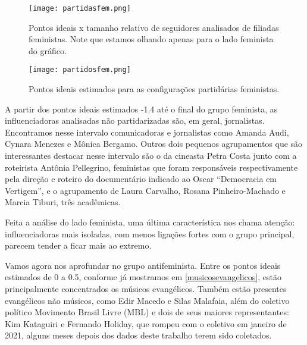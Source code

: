 \documentclass[
	12pt,				%
	openright,			%
	twoside,			%
	a4paper,			%
	english,			%
	brazil				%
	]{abntex2}
\begin{document}
 \begin{figure}[!htbp]
    \centering
    \texttt{[image: partidasfem.png]}
    \caption{Pontos ideais x tamanho relativo de seguidores analisados de filiadas feministas. Note que estamos olhando apenas para o lado feminista do gráfico.}
    \label{partidasfem}
 \end{figure}

 \begin{figure}[!htbp]
    \centering
    \texttt{[image: partidosfem.png]}
    \caption{Pontos ideais estimados para as configurações partidárias feministas.}
    \label{partidosfem}
 \end{figure}
 
 \newpage
  
 A partir dos pontos ideais estimados -1.4 até o final do grupo feminista, as influenciadoras analisadas não partidarizadas são, em geral, jornalistas. Encontramos nesse intervalo comunicadoras e jornalistas como Amanda Audi, Cynara Menezes e Mônica Bergamo. Outros dois pequenos agrupamentos que são interessantes destacar nesse intervalo são o da cineasta Petra Costa junto com a roteirista Antônia Pellegrino, feministas que foram responsáveis respectivamente pela direção e roteiro do documentário indicado ao Oscar ``Democracia em Vertigem'', e o agrupamento de Laura Carvalho, Rosana Pinheiro-Machado e Marcia Tiburi, três acadêmicas.
 
 Feita a análise do lado feminista, uma última característica nos chama atenção: influenciadoras mais isoladas, com menos ligações fortes com o grupo principal, parecem tender a ficar mais ao extremo.
 
 Vamos agora nos aprofundar no grupo antifeminista. Entre os pontos ideais estimados de 0 a 0.5, conforme já mostramos em \ref{musicosevangelicos}, estão principalmente concentrados os músicos evangélicos. Também estão presentes evangélicos não músicos, como Edir Macedo e Silas Malafaia, além do coletivo político Movimento Brasil Livre (MBL) e dois de seus maiores representantes: Kim Kataguiri e Fernando Holiday, que rompeu com o coletivo em janeiro de 2021, alguns meses depois dos dados deste trabalho terem sido coletados.
 
\end{document}
